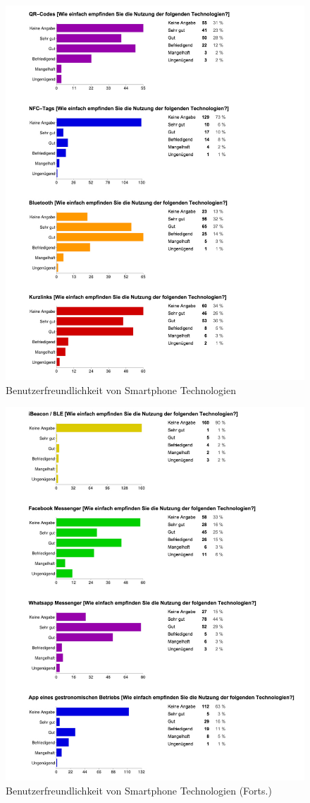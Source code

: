 \begin{figure}[H]
\begin{center}
\includegraphics[width=.9\textwidth]{u04a.jpg}
\caption{Benutzerfreundlichkeit von Smartphone Technologien}
\label{pic:aus4a}
\end{center}
\end{figure}

\begin{figure}[H]
\begin{center}
\includegraphics[width=.9\textwidth]{u04b.jpg}
\caption{Benutzerfreundlichkeit von Smartphone Technologien (Forts.)}
\label{pic:aus4b}
\end{center}
\end{figure}

